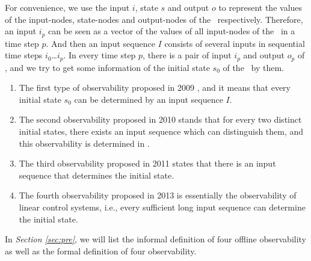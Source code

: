 For convenience, we use the input $i$, state $s$ and output $o$ to represent the values of the input-nodes, state-nodes and output-nodes of the \BCN\ respectively. Therefore, an input $i_p$ can be seen as a vector of the values of all input-nodes of the \BCN\ in a time step $p$. And then an input sequence $I$ consists of several inputs in sequential time steps $i_0$\ldots$i_p$. In every time step $p$, there is a pair of input $i_p$ and output $o_p$ of \BCN, and we try to get some information of the initial state $s_0$ of the \BCN\ by them.
\begin{enumerate}
	\item The first type of observability proposed in 2009 \cite{cheng2009controllability}, and it means that every initial state $s_0$ can be determined by an input sequence $I$.
	
	\item 
	The second observability proposed in 2010 \cite{Zhao2010Input} stands that for every two distinct initial states, there exists an input sequence which can distinguish them, and this observability is determined in \cite{Li2015Controllability}.
	
	\item The third observability proposed in 2011 \cite{Cheng2011Identification} states that there is an input sequence that determines the initial state.
	
	\item  The fourth observability proposed in 2013 \cite{Fornasini2013Observability} is essentially the observability of linear control systems, i.e., every sufficient long input sequence can determine the initial state.
\end{enumerate}
 


In {\em Section \ref{sec:pre}}, we will list the informal definition of four offline  observability as well as the formal definition of four observability.%


